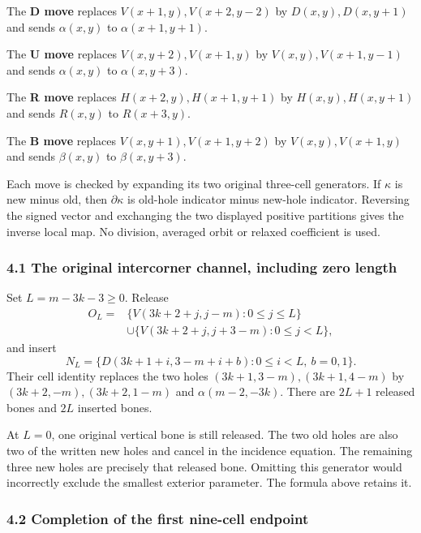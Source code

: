 \documentclass[
  10pt,
]{article}
\begin{document}
The \textbf{D move} replaces \(V(x+1,y),V(x+2,y-2)\) by
\(D(x,y),D(x,y+1)\) and sends \(\alpha(x,y)\) to \(\alpha(x+1,y+1)\).

The \textbf{U move} replaces \(V(x,y+2),V(x+1,y)\) by
\(V(x,y),V(x+1,y-1)\) and sends \(\alpha(x,y)\) to \(\alpha(x,y+3)\).

The \textbf{R move} replaces \(H(x+2,y),H(x+1,y+1)\) by
\(H(x,y),H(x,y+1)\) and sends \(R(x,y)\) to \(R(x+3,y)\).

The \textbf{B move} replaces \(V(x,y+1),V(x+1,y+2)\) by
\(V(x,y),V(x+1,y)\) and sends \(\beta(x,y)\) to \(\beta(x,y+3)\).

Each move is checked by expanding its two original three-cell
generators. If \(\kappa\) is new minus old, then \(\partial\kappa\) is
old-hole indicator minus new-hole indicator. Reversing the signed vector
and exchanging the two displayed positive partitions gives the inverse
local map. No division, averaged orbit or relaxed coefficient is used.

\subsubsection{4.1 The original intercorner channel, including zero
length}\label{the-original-intercorner-channel-including-zero-length}

Set \(L=m-3k-3\ge0\). Release \[
\begin{aligned}
O_L={}&\{V(3k+2+j,j-m):0\le j\le L\}\\
 &\cup\{V(3k+2+j,j+3-m):0\le j<L\},
\end{aligned}
\] and insert \[
N_L=\{D(3k+1+i,3-m+i+b):0\le i<L,\ b=0,1\}.
\] Their cell identity replaces the two holes \((3k+1,3-m),(3k+1,4-m)\)
by \((3k+2,-m),(3k+2,1-m)\) and \(\alpha(m-2,-3k)\). There are \(2L+1\)
released bones and \(2L\) inserted bones.

At \(L=0\), one original vertical bone is still released. The two old
holes are also two of the written new holes and cancel in the incidence
equation. The remaining three new holes are precisely that released
bone. Omitting this generator would incorrectly exclude the smallest
exterior parameter. The formula above retains it.

\subsubsection{4.2 Completion of the first nine-cell
endpoint}\label{completion-of-the-first-nine-cell-endpoint}
\end{document}
